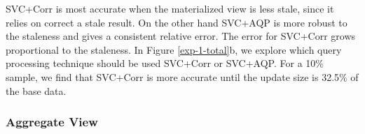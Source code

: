 SVC+Corr is most accurate when the materialized view is less stale, since it relies on correct a stale result.
On the other hand SVC+AQP is more robust to the staleness and gives a consistent relative error.
The error for SVC+Corr grows proportional to the staleness.
In Figure \ref{exp-1-total}b, we explore which query processing technique should be used SVC+Corr or SVC+AQP.
For a 10\% sample, we find that SVC+Corr is more accurate until the update size is 32.5\% of the base data.


\subsubsection{Aggregate View}
\label{exp-datacube}

